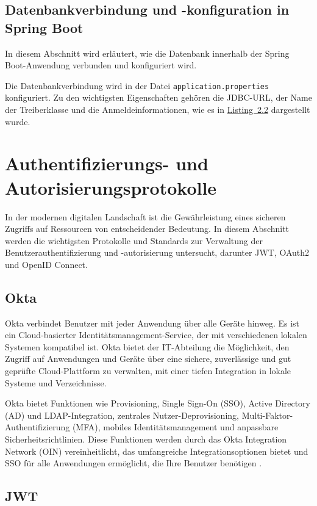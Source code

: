 \subsection{Datenbankverbindung und -konfiguration in Spring Boot}
In diesem Abschnitt wird erläutert, wie die Datenbank innerhalb der Spring Boot-Anwendung verbunden und konfiguriert wird.

Die Datenbankverbindung wird in der Datei \texttt{application.properties} konfiguriert. Zu den wichtigsten Eigenschaften gehören die JDBC-URL, der Name der Treiberklasse und die Anmeldeinformationen, wie es in \hyperref[Application.properties]{Listing~2.2} dargestellt wurde.

\section{Authentifizierungs- und Autorisierungsprotokolle}

In der modernen digitalen Landschaft ist die Gewährleistung eines sicheren Zugriffs auf Ressourcen von entscheidender Bedeutung. In diesem Abschnitt werden die wichtigsten Protokolle und Standards zur Verwaltung der Benutzerauthentifizierung und -autorisierung untersucht, darunter JWT, OAuth2 und OpenID Connect.

\subsection{Okta}
Okta verbindet Benutzer mit jeder Anwendung über alle Geräte hinweg. Es ist ein Cloud-basierter Identitätsmanagement-Service, der mit verschiedenen lokalen Systemen kompatibel ist. Okta bietet der IT-Abteilung die Möglichkeit, den Zugriff auf Anwendungen und Geräte über eine sichere, zuverlässige und gut geprüfte Cloud-Plattform zu verwalten, mit einer tiefen Integration in lokale Systeme und Verzeichnisse.

Okta bietet Funktionen wie Provisioning, Single Sign-On (SSO), Active Directory (AD) und LDAP-Integration, zentrales Nutzer-Deprovisioning, Multi-Faktor-Authentifizierung (MFA), mobiles Identitätsmanagement und anpassbare Sicherheitsrichtlinien. Diese Funktionen werden durch das Okta Integration Network (OIN) vereinheitlicht, das umfangreiche Integrationsoptionen bietet und SSO für alle Anwendungen ermöglicht, die Ihre Benutzer benötigen \cite{Okta:o.J}.

\subsection{JWT}

